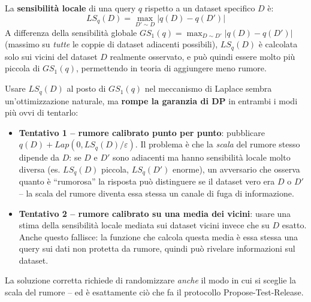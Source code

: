 \documentclass[a4paper,11pt]{article}
\begin{document}
\begin{definizione}
La \textbf{sensibilit\`{a} locale} di una query $q$ rispetto a un dataset specifico $D$ \`{e}:
\[
LS_q(D) = \max_{D' \sim D} |q(D) - q(D')|
\]
A differenza della sensibilit\`{a} globale $GS_1(q) = \max_{D \sim D'} |q(D)-q(D')|$ (massimo su \emph{tutte} le coppie di dataset adiacenti possibili), $LS_q(D)$ \`{e} calcolata solo sui vicini del dataset $D$ realmente osservato, e pu\`{o} quindi essere molto pi\`{u} piccola di $GS_1(q)$, permettendo in teoria di aggiungere meno rumore.
\end{definizione}

\begin{nota}
Usare $LS_q(D)$ al posto di $GS_1(q)$ nel meccanismo di Laplace sembra un'ottimizzazione naturale, ma \textbf{rompe la garanzia di DP} in entrambi i modi pi\`{u} ovvi di tentarlo:
\begin{itemize}
  \item \textbf{Tentativo 1 -- rumore calibrato punto per punto}: pubblicare $q(D) + Lap(0, LS_q(D)/\varepsilon)$. Il problema \`{e} che la \emph{scala} del rumore stesso dipende da $D$: se $D$ e $D'$ sono adiacenti ma hanno sensibilit\`{a} locale molto diversa (es. $LS_q(D)$ piccola, $LS_q(D')$ enorme), un avversario che osserva quanto \`{e} ``rumorosa'' la risposta pu\`{o} distinguere se il dataset vero era $D$ o $D'$ -- la scala del rumore diventa essa stessa un canale di fuga di informazione.
  \item \textbf{Tentativo 2 -- rumore calibrato su una media dei vicini}: usare una stima della sensibilit\`{a} locale mediata sui dataset vicini invece che su $D$ esatto. Anche questo fallisce: la funzione che calcola questa media \`{e} essa stessa una query sui dati non protetta da rumore, quindi pu\`{o} rivelare informazioni sul dataset.
\end{itemize}
La soluzione corretta richiede di randomizzare \emph{anche} il modo in cui si sceglie la scala del rumore -- ed \`{e} esattamente ci\`{o} che fa il protocollo Propose-Test-Release.
\end{nota}
\end{document}
